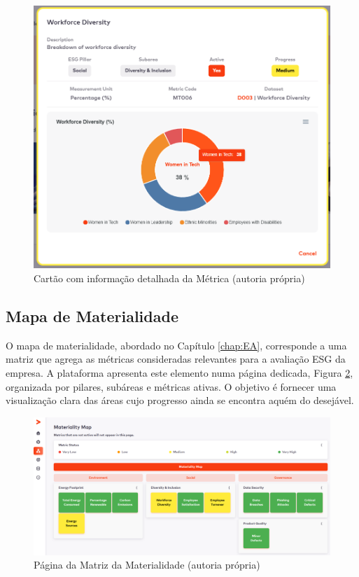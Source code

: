 \begin{figure}[H]
    \centering
    \includegraphics[width=5.5in,keepaspectratio]{frontmatter/assets/platform_prints/metrics/metric_info.png}
    \caption{Cartão com informação detalhada da Métrica (autoria própria)}
    \label{fig:metric_info}
\end{figure}

\subsection{Mapa de Materialidade}

O mapa de materialidade, abordado no Capítulo \ref{chap:EA}, corresponde a uma matriz que agrega as métricas consideradas relevantes para a avaliação ESG da empresa. A plataforma apresenta este elemento numa página dedicada, Figura \ref{fig:matrix_done}, organizada por pilares, subáreas e métricas ativas. O objetivo é fornecer uma visualização clara das áreas cujo progresso ainda se encontra aquém do desejável.

\begin{figure}[H]
    \centering
    \includegraphics[width=\linewidth,keepaspectratio]{frontmatter/assets/platform_prints/matrix/matrix_done.png}
    \caption{Página da Matriz da Materialidade (autoria própria)}
    \label{fig:matrix_done}
\end{figure}

